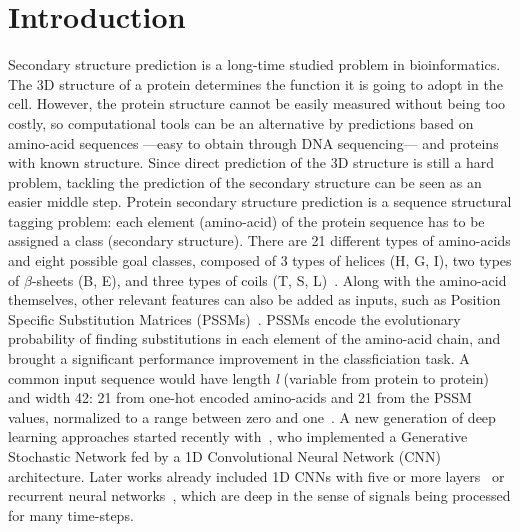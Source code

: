 \documentclass{article}
\begin{document}
\section{Introduction}
\label{sec:intro}



Secondary structure prediction is a long-time studied problem in bioinformatics.
The 3D structure of a protein determines the function it is going to adopt in the cell.
However, the protein structure cannot be easily measured without being too costly, so computational tools can be an alternative by predictions based on amino-acid sequences ---easy to obtain through DNA sequencing--- and proteins with known structure.
Since direct prediction of the 3D structure is still a hard problem, tackling the prediction of the secondary structure can be seen as an easier middle step.
Protein secondary structure prediction is a sequence structural tagging problem: each element (amino-acid) of the protein sequence has to be assigned a class (secondary structure).
There are 21 different types of amino-acids and eight possible goal classes, composed of 3 types of helices (H, G, I), two types of $\beta$-sheets (B, E), and three types of coils (T, S, L)~\cite{Kabsch1983}.
Along with the amino-acid themselves, other relevant features can also be added as inputs, such as Position Specific Substitution Matrices (PSSMs)~\cite{Yang2018}.
PSSMs encode the evolutionary probability of finding substitutions in each element of the amino-acid chain, and brought a significant performance improvement in the classficiation task.
A common input sequence would have length \textit{l} (variable from protein to protein) and width 42: 21 from one-hot encoded amino-acids and 21 from the PSSM values, normalized to a range between zero and one~\cite{Busia2017}.
A new generation of deep learning approaches started recently with~\cite{Zhou2014}, who implemented a Generative Stochastic Network fed by a 1D Convolutional Neural Network (CNN) architecture.
Later works already included 1D CNNs with five or more layers~\cite{Wang2016,Fang2017,Zhou2018} or recurrent neural networks~\cite{Li2016,Jurtz2017}, which are deep in the sense of signals being processed for many time-steps.
\end{document}
